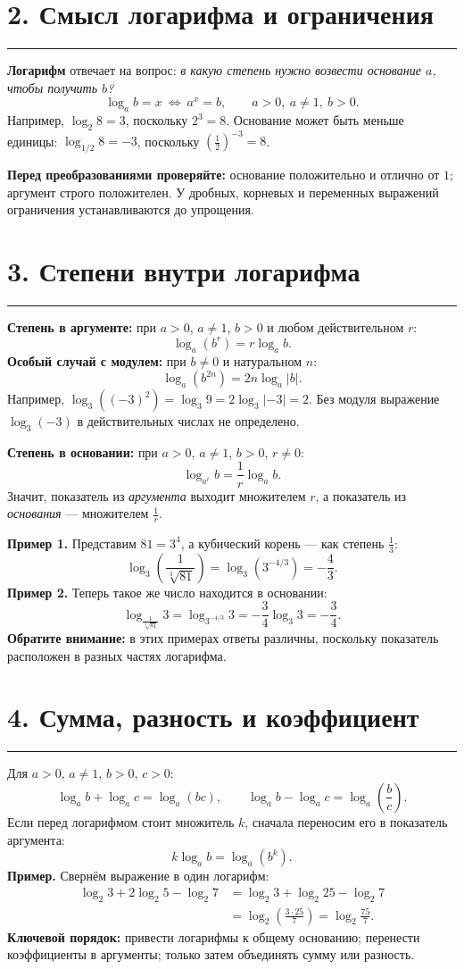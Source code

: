 \documentclass[a4paper,12pt]{article}
\newcommand{\sectionline}{\par\vspace{1pt}\noindent\color{accent}\rule{\linewidth}{0.6pt}\par\color{textgray}\vspace{3pt}}
\newcommand{\term}[1]{\textbf{\color{darkaccent}#1}}
\begin{document}
\section*{2. Смысл логарифма и ограничения}
\sectionline
\term{Логарифм} отвечает на вопрос: \emph{в какую степень нужно возвести основание $a$, чтобы получить $b$?}
\[
\boxed{\log_a b=x\ \Longleftrightarrow\ a^x=b},
\qquad a>0,\ a\ne1,\ b>0.
\]
Например, $\log_2 8=3$, поскольку $2^3=8$. Основание может быть меньше единицы: $\log_{1/2}8=-3$, поскольку $\left(\frac12\right)^{-3}=8$.

\textbf{Перед преобразованиями проверяйте:} основание положительно и отлично от $1$; аргумент строго положителен. У дробных, корневых и переменных выражений ограничения устанавливаются до упрощения.

\section*{3. Степени внутри логарифма}
\sectionline
\term{Степень в аргументе:} при $a>0$, $a\ne1$, $b>0$ и любом действительном $r$:
\[
\boxed{\log_a\!\left(b^r\right)=r\log_a b}.
\]
\term{Особый случай с модулем:} при $b\ne0$ и натуральном $n$:
\[
\boxed{\log_a\!\left(b^{2n}\right)=2n\log_a|b|}.
\]
Например, $\log_3\!\left((-3)^2\right)=\log_3 9=2\log_3|-3|=2$. Без модуля выражение $\log_3(-3)$ в действительных числах не определено.

\term{Степень в основании:} при $a>0$, $a\ne1$, $b>0$, $r\ne0$:
\[
\boxed{\log_{a^r}b=\frac{1}{r}\log_a b}.
\]
Значит, показатель из \emph{аргумента} выходит множителем $r$, а показатель из \emph{основания} --- множителем $\frac1r$.

\textbf{Пример 1.} Представим $81=3^4$, а кубический корень --- как степень $\frac13$:
\[
\log_3\!\left(\frac1{\sqrt[3]{81}}\right)
=\log_3\!\left(3^{-4/3}\right)
=-\frac43.
\]
\textbf{Пример 2.} Теперь такое же число находится в основании:
\[
\log_{\frac1{\sqrt[3]{81}}}3
=\log_{3^{-4/3}}3
=-\frac34\log_3 3=-\frac34.
\]
\textbf{Обратите внимание:} в этих примерах ответы различны, поскольку показатель расположен в разных частях логарифма.

\section*{4. Сумма, разность и коэффициент}
\sectionline
Для $a>0$, $a\ne1$, $b>0$, $c>0$:
\[
\boxed{\log_a b+\log_a c=\log_a(bc)},\qquad
\boxed{\log_a b-\log_a c=\log_a\!\left(\frac bc\right)}.
\]
Если перед логарифмом стоит множитель $k$, сначала переносим его в показатель аргумента:
\[
\boxed{k\log_a b=\log_a\!\left(b^k\right)}.
\]
\textbf{Пример.} Свернём выражение в один логарифм:
\[
\begin{aligned}
\log_2 3+2\log_2 5-\log_2 7
&=\log_2 3+\log_2 25-\log_2 7\\
&=\log_2\!\left(\frac{3\cdot25}{7}\right)
=\boxed{\log_2\frac{75}{7}}.
\end{aligned}
\]
\textbf{Ключевой порядок:} привести логарифмы к общему основанию; перенести коэффициенты в аргументы; только затем объединять сумму или разность.
\end{document}
